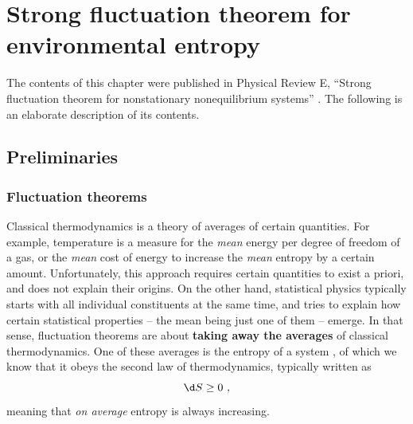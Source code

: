 \chapter{Strong fluctuation theorem for environmental entropy}
\label{chap:thingie}

The contents of this chapter were published in Physical Review E, ``Strong fluctuation theorem for nonstationary nonequilibrium systems'' \cite{bib:thingie-paper}. The following is an elaborate description of its contents.


\section{Preliminaries}



\subsection{Fluctuation theorems}

Classical thermodynamics is a theory of averages of certain quantities. For example, temperature is a measure for the \emph{mean} energy per degree of freedom of a gas, or the \emph{mean} cost of energy to increase the \emph{mean} entropy by a certain amount. Unfortunately, this approach requires certain quantities to exist a priori, and does not explain their origins. On the other hand, statistical physics typically starts with all individual constituents at the same time, and tries to explain how certain statistical properties -- the mean being just one of them -- emerge. In that sense, fluctuation theorems are about \textbf{taking away the averages} of classical thermodynamics. One of these averages is the entropy of a system , of which we know that it obeys the second law of thermodynamics, typically written as
%
\begin{equation}
	\label{eqn:2nd_law_classical}
	\d S \geq 0 ~,
\end{equation}
%
meaning that \emph{on average} entropy is always increasing.

